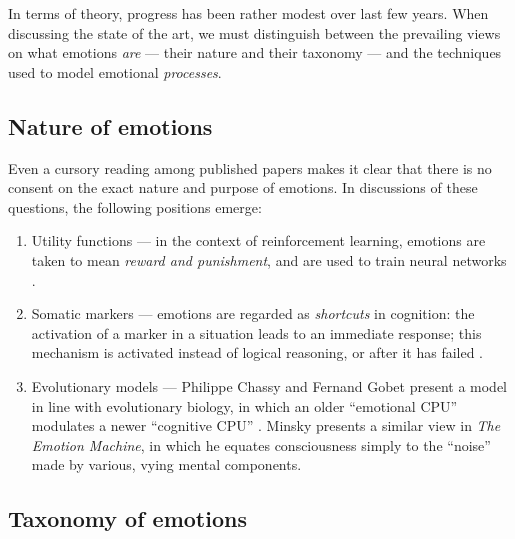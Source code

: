 \documentclass[]{scrartcl}
\newcommand{\highlight}[1]{\colorbox{yellow!80}{#1}}
\begin{document}
In terms of theory, progress has been rather modest over last few years. When discussing the state of the art, we must distinguish between the prevailing views on what emotions {\em are} --- their nature and their taxonomy --- and the techniques used to model emotional {\em processes}.

\subsection{Nature of emotions}

 Even a cursory reading among published papers makes it clear that there is no consent on the exact nature and purpose of emotions. In discussions of these questions, the following positions emerge:
\begin{enumerate}
	\item Utility functions --- in the context of reinforcement learning, emotions are taken to mean {\em reward and punishment}, and are used to train neural networks \highlight{\cite{rolls2003,ahnpicard2006}}.
	\item Somatic markers --- emotions are regarded as {\em shortcuts} in cognition: the activation of a marker in a situation leads to an immediate response; this mechanism is activated instead of logical reasoning, or after it has failed \highlight{\cite{damasio1994,bechara2005}}.
	\item Evolutionary models --- Philippe Chassy and Fernand Gobet present a model in line with evolutionary biology, in which an older ``emotional CPU'' modulates a newer ``cognitive CPU'' \cite{chassy2005}. Minsky \cite{minsky} presents a similar view in {\em The Emotion Machine}, in which he equates consciousness simply to the ``noise'' made by various, vying mental components.
\end{enumerate}

\subsection{Taxonomy of emotions}
\end{document}
